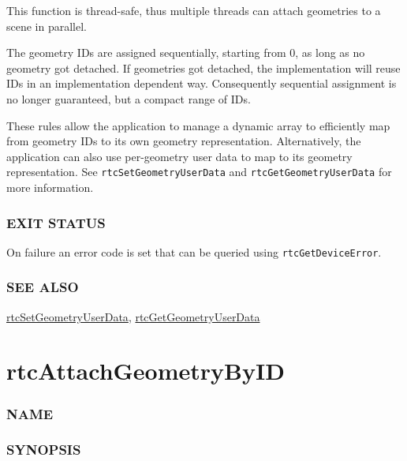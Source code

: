 This function is thread-safe, thus multiple threads can attach
geometries to a scene in parallel.

The geometry IDs are assigned sequentially, starting from 0, as long as
no geometry got detached. If geometries got detached, the implementation
will reuse IDs in an implementation dependent way. Consequently
sequential assignment is no longer guaranteed, but a compact range of
IDs.

These rules allow the application to manage a dynamic array to
efficiently map from geometry IDs to its own geometry representation.
Alternatively, the application can also use per-geometry user data to
map to its geometry representation. See \texttt{rtcSetGeometryUserData}
and \texttt{rtcGetGeometryUserData} for more information.

\subsubsection{EXIT STATUS}\label{exit-status}

On failure an error code is set that can be queried using
\texttt{rtcGetDeviceError}.

\subsubsection{SEE ALSO}\label{see-also}

\hyperref[rtcsetgeometryuserdata]{rtcSetGeometryUserData},
\hyperref[rtcgetgeometryuserdata]{rtcGetGeometryUserData}

\pagebreak

\section{rtcAttachGeometryByID}\label{rtcattachgeometrybyid}

\subsubsection{NAME}\label{name}

\begin{Shaded}
\begin{Highlighting}[]
\OperatorTok{{-}}
\end{Highlighting}
\end{Shaded}

\subsubsection{SYNOPSIS}\label{synopsis}

